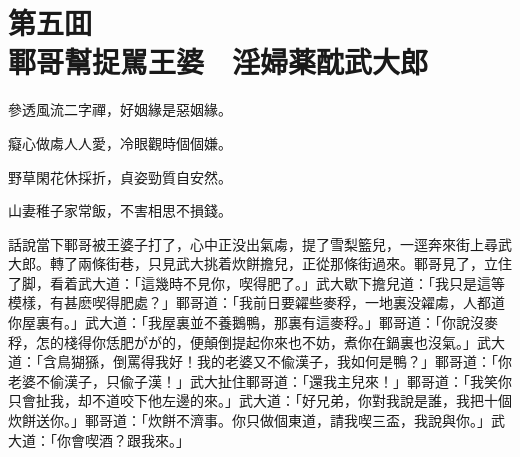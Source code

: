 
\chapter*{第五囬　\\鄆哥幫捉駡王婆　淫婦薬酖武大郎}


\begin{myquote}
參透風流二字禪，好姻緣是惡姻緣。

癡心做䖏人人愛，冷眼觀時個個嫌。

野草閑花休採折，貞姿勁質自安然。

山妻稚子家常飯，不害相思不損錢。
\end{myquote}

話說當下鄆哥被王婆子打了，心中正没出氣䖏，提了雪梨籃兒，一逕奔來街上尋武大郎。轉了兩條街巷，只見武大挑着炊餅擔兒，正從那條街過來。鄆哥見了，立住了脚，看着武大道：「這幾時不見你，喫得肥了。」武大歇下擔兒道：「我只是這等模樣，有甚麽喫得肥處？」鄆哥道：「我前日要糴些麥稃，一地裏没糴䖏，人都道你屋裏有。」武大道：「我屋裏並不養鵝鴨，那裏有這麥稃。」鄆哥道：「你說沒麥稃，怎的棧得你恁肥がが的，便顛倒提起你來也不妨，煮你在鍋裏也沒氣。」武大道：「含鳥猢猻，倒罵得我好！我的老婆又不偸漢子，我如何是鴨？」鄆哥道：「你老婆不偷漢子，只偸子漢！」武大扯住鄆哥道：「還我主兒來！」鄆哥道：「我笑你只會扯我，却不道咬下他左邊的來。」武大道：「好兄弟，你對我說是誰，我把十個炊餅送你。」鄆哥道：「炊餅不濟事。你只做個東道，請我喫三盃，我說與你。」武大道：「你會喫酒？跟我來。」

